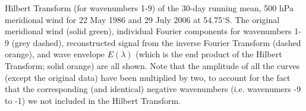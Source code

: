 \label{fig:example_hilbert}
Hilbert Transform (for wavenumbers 1-9) of the 30-day running mean, 500 hPa meridional wind for 22 May 1986 and 29 July 2006 at 54.75$^{\circ}$S. The original meridional wind (solid green), individual Fourier components for wavenumbers 1-9 (grey dashed), reconstructed signal from the inverse Fourier Transform (dashed orange), and wave envelope $E(\lambda)$ (which is the end product of the Hilbert Transform; solid orange) are all shown. Note that the amplitude of all the curves (except the original data) have been multiplied by two, to account for the fact that the corresponding (and identical) negative wavenumbers (i.e. wavenumers -9 to -1) we not included in the Hilbert Transform. 